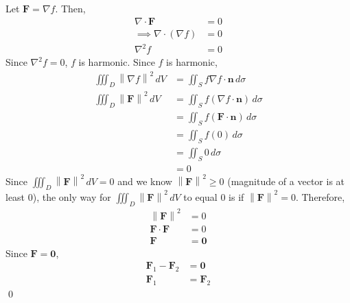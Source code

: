 \documentclass{article}
\newcommand{\lrp}[1]{\left( #1 \right)}
\newcommand{\norm}[1]{\left\lVert #1 \right\rVert}
\newcommand{\F}[0]{\mathbf{F}}
\newcommand{\n}[0]{\mathbf{n}}
\begin{document}
\begin{mdframed}[backgroundcolor=white,linecolor=white]
Let $\F=\nabla f$. Then,
\begin{align*}
    \nabla \cdot \F &= 0\\
    \implies \nabla \cdot \lrp{\nabla f}&=0\\
    \nabla^2 f &= 0
\end{align*}
Since $\nabla^2 f = 0$, $f$ is harmonic. Since $f$ is harmonic, \begin{align*}
   \iiint_D \norm{\nabla f}^2\,dV &=\iint_S f\nabla f \cdot \n\,d\sigma\tag{see Homework 24, 1(b)}\\
   \iiint_D \norm{\F}^2\,dV&=\iint_S f\lrp{\nabla f \cdot \n}\,d\sigma\tag{$f$ is a scalar function}\\
   &=\iint_S f\lrp{\F\cdot\n}\,d\sigma\\
   &=\iint_S f\lrp{0}\,d\sigma\\
   &=\iint_S 0\,d\sigma\\
   &=0
\end{align*}
Since $\displaystyle \iiint_D \norm{\F}^2\,dV=0$ and we know $\norm{\F}^2\geq 0$ (magnitude of a vector is at least $0$), the only way for $\displaystyle\iiint_D \norm{\F}^2\,dV$ to equal $0$ is if $\norm{\F}^2=0$. Therefore,
\begin{align*}
    \norm{\F}^2 &= 0\\
    \F \cdot \F &= 0\\
    \F &= \mathbf{0}
\end{align*}
Since $\F=\mathbf{0}$,
\begin{align*}
    \F_1 - \F_2 &= \mathbf{0}\\
    \F_1 &= \F_2
\end{align*}
\qed
\end{mdframed}
\end{document}
